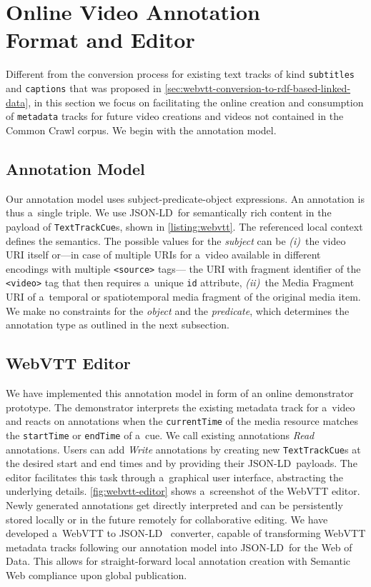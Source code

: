 \documentclass{sig-alternate}
\def\JSONLD{\mbox{JSON-LD}}
\begin{document}
\section{Online Video Annotation\\ Format and Editor}
\label{sec:online-video-annotation-format-and-editor}

Different from the conversion process for existing text tracks
of kind \texttt{subtitles} and \texttt{captions}
that was proposed in \autoref{sec:webvtt-conversion-to-rdf-based-linked-data},
in this section we focus on facilitating the online creation and consumption
of \texttt{metadata} tracks for future video creations
and videos not contained in the Common Crawl corpus.
We begin with the annotation model.

\subsection{Annotation Model}

Our annotation model uses subject-predicate-object expressions.
An annotation is thus a~single triple.
We use \JSONLD\ for semantically rich content
in the payload of \texttt{TextTrackCue}s, shown in
\autoref{listing:webvtt}.
The referenced local context defines the semantics.
The possible values for the \emph{subject} can be \emph{(i)}~the video
URI itself or---in case of multiple URIs for a~video available
in different encodings with multiple \texttt{<source>} tags---%
the URI with fragment identifier of the \texttt{<video>} tag
that then requires a~unique \texttt{id} attribute,
\emph{(ii)}~the Media Fragment URI of a~temporal or spatiotemporal
media fragment of the original media item.
We make no constraints for the \emph{object} 
and the \emph{predicate},
which determines the annotation type as outlined in the next subsection.

\subsection{WebVTT Editor}

We have implemented this annotation model
in form of an online demonstrator prototype.
The demonstrator interprets the existing metadata track for a~video
and reacts on annotations when the \texttt{currentTime}
of the media resource matches the
\texttt{startTime} or \texttt{endTime} of a~cue.
We call existing annotations \emph{Read} annotations.
Users can add \emph{Write} annotations
by creating new \texttt{TextTrackCue}s
at the desired start and end times
and by providing their \JSONLD~payloads.
The editor facilitates this task through a~graphical user interface, abstracting the underlying details.
\autoref{fig:webvtt-editor} shows a~screenshot of the WebVTT editor.
Newly generated annotations get directly interpreted
and can be persistently stored locally
or in the future remotely for collaborative editing.
We have developed a~WebVTT to \JSONLD~%
converter, capable of transforming WebVTT metadata tracks
following our annotation model
into \JSONLD~for the Web of Data.
This allows for straight-forward local annotation creation
with Semantic Web compliance upon global publication.
\end{document}
